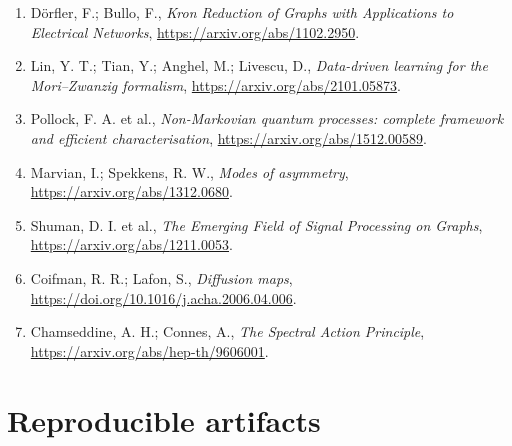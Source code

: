 \documentclass[11pt,a4paper,openany]{report}
\begin{document}
\begin{enumerate}
\item 
Dörfler, F.; Bullo, F., \emph{Kron Reduction of Graphs with Applications to Electrical Networks}, \href{https://arxiv.org/abs/1102.2950}{https:/\allowbreak{}/\allowbreak{}arxiv.org/\allowbreak{}abs/\allowbreak{}1102.2950}.

\item 
Lin, Y. T.; Tian, Y.; Anghel, M.; Livescu, D., \emph{Data-driven learning for the Mori--Zwanzig formalism}, \href{https://arxiv.org/abs/2101.05873}{https:/\allowbreak{}/\allowbreak{}arxiv.org/\allowbreak{}abs/\allowbreak{}2101.05873}.

\item 
Pollock, F. A. et al., \emph{Non-Markovian quantum processes: complete framework and efficient characterisation}, \href{https://arxiv.org/abs/1512.00589}{https:/\allowbreak{}/\allowbreak{}arxiv.org/\allowbreak{}abs/\allowbreak{}1512.00589}.

\item 
Marvian, I.; Spekkens, R. W., \emph{Modes of asymmetry}, \href{https://arxiv.org/abs/1312.0680}{https:/\allowbreak{}/\allowbreak{}arxiv.org/\allowbreak{}abs/\allowbreak{}1312.0680}.

\item 
Shuman, D. I. et al., \emph{The Emerging Field of Signal Processing on Graphs}, \href{https://arxiv.org/abs/1211.0053}{https:/\allowbreak{}/\allowbreak{}arxiv.org/\allowbreak{}abs/\allowbreak{}1211.0053}.

\item 
Coifman, R. R.; Lafon, S., \emph{Diffusion maps}, \href{https://doi.org/10.1016/j.acha.2006.04.006}{https:/\allowbreak{}/\allowbreak{}doi.org/\allowbreak{}10.1016/\allowbreak{}j.acha.2006.04.006}.

\item 
Chamseddine, A. H.; Connes, A., \emph{The Spectral Action Principle}, \href{https://arxiv.org/abs/hep-th/9606001}{https:/\allowbreak{}/\allowbreak{}arxiv.org/\allowbreak{}abs/\allowbreak{}hep-th/\allowbreak{}9606001}.

\end{enumerate}

\chapter{Reproducible artifacts}
\end{document}
